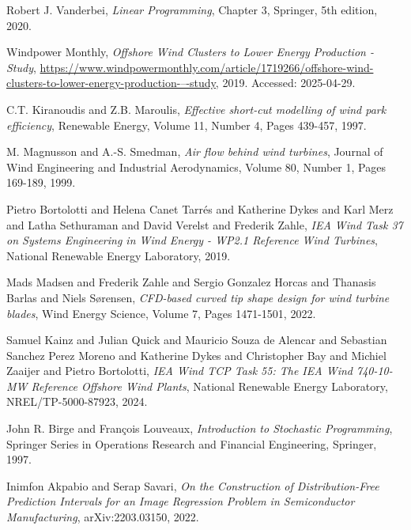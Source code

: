 \documentclass[preprint,12pt]{elsarticle}
\begin{document}
\begin{thebibliography}{00}
Robert J. Vanderbei,
\textit{Linear Programming},
Chapter 3,
Springer,
5th edition,
2020.

Windpower Monthly,
\textit{Offshore Wind Clusters to Lower Energy Production - Study},
\url{https://www.windpowermonthly.com/article/1719266/offshore-wind-clusters-to-lower-energy-production-–-study},
2019.
Accessed: 2025-04-29.

C.T. Kiranoudis and Z.B. Maroulis,
\textit{Effective short-cut modelling of wind park efficiency},
Renewable Energy,
Volume 11,
Number 4,
Pages 439-457,
1997.

M. Magnusson and A.-S. Smedman,
\textit{Air flow behind wind turbines},
Journal of Wind Engineering and Industrial Aerodynamics,
Volume 80,
Number 1,
Pages 169-189,
1999.

Pietro Bortolotti and Helena Canet Tarrés and Katherine Dykes and Karl Merz and Latha Sethuraman and David Verelst and Frederik Zahle,
\textit{IEA Wind Task 37 on Systems Engineering in Wind Energy - WP2.1 Reference Wind Turbines},
National Renewable Energy Laboratory,
2019.

Mads Madsen and Frederik Zahle and Sergio Gonzalez Horcas and Thanasis Barlas and Niels Sørensen,
\textit{CFD-based curved tip shape design for wind turbine blades},
Wind Energy Science,
Volume 7,
Pages 1471-1501,
2022.

Samuel Kainz and Julian Quick and Mauricio Souza de Alencar and Sebastian Sanchez Perez Moreno and Katherine Dykes and Christopher Bay and Michiel Zaaijer and Pietro Bortolotti,
\textit{IEA Wind TCP Task 55: The IEA Wind 740-10-MW Reference Offshore Wind Plants},
National Renewable Energy Laboratory,
NREL/TP-5000-87923,
2024.

John R. Birge and François Louveaux,
\textit{Introduction to Stochastic Programming},
Springer Series in Operations Research and Financial Engineering,
Springer,
1997.

Inimfon Akpabio and Serap Savari,
\textit{On the Construction of Distribution-Free Prediction Intervals for an Image Regression Problem in Semiconductor Manufacturing},
arXiv:2203.03150,
2022.


\end{thebibliography}
\end{document}
